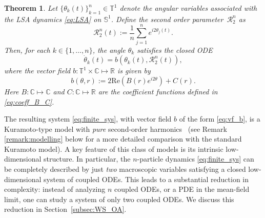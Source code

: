 \documentclass[10pt]{article}
\newtheorem{theorem}{Theorem}[section]
\theoremstyle{definition}
\theoremstyle{definition}
\numberwithin{equation}{section}
\newcommand{\R}{\mathbb{R}}
\newcommand{\BBS}{\mathbb{S}}
\newcommand{\BBC}{\mathbb{C}}
\newcommand{\BBT}{\mathbb{T}}
\newcommand{\CR}{\mathcal{R}}
\newcommand{\re}[1]{\mathrm{Re}\left(#1\right)}
\begin{document}
\begin{theorem}
    \label{thm:finite_sys}
    Let $\{\theta_k(t)\}_{k=1}^n \in \BBT^1$ denote the angular variables associated with the LSA dynamics \eqref{eq:LSA} on $\BBS^1$.
    Define the second order parameter~$\CR_2^n$ as
    \begin{equation}\label{eq:order_param_finite}
        \CR_2^n(t) := \frac{1}{n} \sum_{j=1}^n e^{i2\theta_j(t)} .
    \end{equation}
    Then, for each $k \in \{1,\dots,n\}$, the angle $\theta_k$ satisfies the closed ODE
    \begin{equation}\label{eq:finite_sys}
        \Dot{\theta}_k(t) =  b \left(\theta_k(t), \CR^{n}_2 (t) \right), 
    \end{equation}
    where the vector field $ b: \BBT^1 \times \BBC \mapsto \R$ is given by
    \begin{equation}
        \label{eq:vf_b}
        b(\theta, r)
        := 2 \re{B(r) e^{i2\theta}} + C(r) .
    \end{equation}
    Here $B: \BBC \mapsto \BBC$ and $C: \BBC \mapsto \R$ are the coefficient functions defined in \eqref{eq:coeff_B_C}.
\end{theorem}
The resulting system \eqref{eq:finite_sys}, with vector field $b$ of the form \eqref{eq:vf_b}, is a Kuramoto-type model with \textit{pure} second-order harmonics~\cite{skardal2011cluster} (see Remark \ref{remark:modelling} below for a more detailed comparison with the standard Kuramoto model). 
A key feature of this class of models is its intrinsic low-dimensional structure.
In particular, the $n$-particle dynamics \eqref{eq:finite_sys} can be completely described by just \emph{two} macroscopic variables satisfying a closed low-dimensional system of coupled ODEs.
This leads to a substantial reduction in complexity: instead of analyzing $n$ coupled ODEs, or a PDE in the mean-field limit, one can study a system of only two coupled ODEs.
We discuss this reduction in Section~\ref{subsec:WS_OA}.
\end{document}
